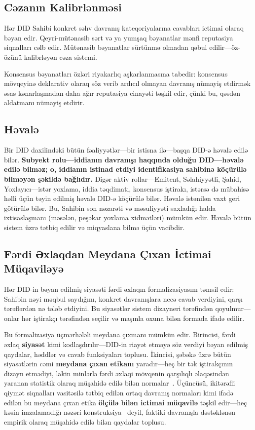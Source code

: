 \documentclass[11pt,a4paper,twocolumn]{article}
\begin{document}
\subsection{Cəzanın Kalibrlənməsi}

Hər DID Sahibi konkret səhv davranış kateqoriyalarına cavabları ictimai olaraq bəyan edir. Qeyri-mütənasib sərt və ya yumşaq bəyanatlar mənfi reputasiya siqnalları cəlb edir. Mütənasib bəyanatlar sürtünmə olmadan qəbul edilir---öz-özünü kalibrləyən cəza sistemi.

Konsensus bəyanatları özləri riyakarlıq aşkarlanmasına tabedir: konsensus mövqeyinə deklarativ olaraq söz verib ardıcıl olmayan davranış nümayiş etdirmək əsas kənarlaşmadan daha ağır reputasiya cinayəti təşkil edir, çünki bu, qəsdən aldatmanı nümayiş etdirir.

\subsection{Həvalə}

Bir DID daxilindəki bütün fəaliyyətlər---bir istisna ilə---başqa DID-ə həvalə edilə bilər. \textbf{Subyekt rolu---iddianın davranışı haqqında olduğu DID---həvalə edilə bilməz; o, iddianın istinad etdiyi identifikasiya sahibinə köçürülə bilməyən şəkildə bağlıdır.} Digər aktiv rollar---Emitent, Səlahiyyətli, Şahid, Yoxlayıcı---istər yoxlama, iddia təqdimatı, konsensus iştirakı, istərsə də mübahisə həlli üçün təyin edilmiş həvalə DID-ə köçürülə bilər. Həvalə istənilən vaxt geri götürülə bilər. Bu, Sahibin son nəzarəti və məsuliyyəti saxladığı halda ixtisaslaşmanı (məsələn, peşəkar yoxlama xidmətləri) mümkün edir. Həvalə bütün sistem üzrə tətbiq edilir və miqyaslana bilmə üçün vacibdir.

\subsection{Fərdi Əxlaqdan Meydana Çıxan İctimai Müqaviləyə}

Hər DID-in bəyan edilmiş siyasəti fərdi əxlaqın formalizasiyasını təmsil edir: Sahibin nəyi məqbul saydığını, konkret davranışlara necə cavab verdiyini, qarşı tərəflərdən nə tələb etdiyini. Bu siyasətlər sistem dizayneri tərəfindən qoyulmur---onlar hər iştirakçı tərəfindən seçilir və maşınla oxuna bilən formada ifadə edilir.

Bu formalizasiya üçmərhələli meydana çıxmanı mümkün edir. Birincisi, fərdi əxlaq \textbf{siyasət} kimi kodlaşdırılır---DID-in riayət etməyə söz verdiyi bəyan edilmiş qaydalar, həddlər və cavab funksiyaları toplusu. İkincisi, şəbəkə üzrə bütün siyasətlərin cəmi \textbf{meydana çıxan etikanı} yaradır---heç bir tək iştirakçının dizayn etmədiyi, lakin minlərlə fərdi əxlaqi mövqenin qarşılıqlı əlaqəsindən yaranan statistik olaraq müşahidə edilə bilən normalar~\cite{durkheim1893}. Üçüncüsü, ikitərəfli qiymət siqnalları vasitəsilə tətbiq edilən ortaq davranış normaları kimi ifadə edilən bu meydana çıxan etika \textbf{ölçülə bilən ictimai müqavilə} təşkil edir---heç kəsin imzalamadığı nəzəri konstruksiya~\cite{rawls1971} deyil, faktiki davranışla dəstəklənən empirik olaraq müşahidə edilə bilən qaydalar toplusu.
\end{document}
